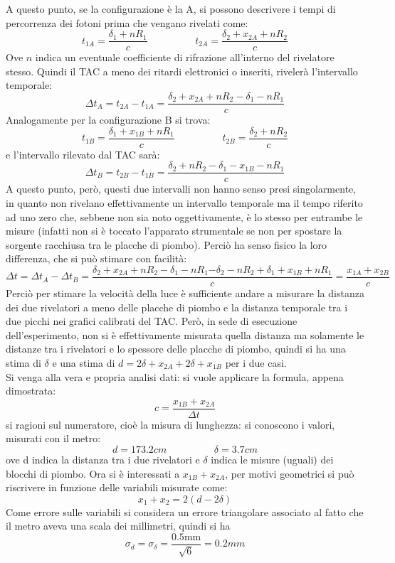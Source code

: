 A questo punto, se la configurazione è la A, si possono descrivere i tempi di percorrenza dei fotoni prima che vengano rivelati come:
$$
  t_{1A} = \frac{\delta_1 + nR_1}{c} \hspace{2cm} t_{2A} = \frac{\delta_2 + x_{2A} + nR_2}{c}
$$
Ove $n$ indica un eventuale coefficiente di rifrazione all'interno del rivelatore stesso. Quindi il TAC a meno dei ritardi elettronici o inseriti, rivelerà l'intervallo temporale:
$$
  \Delta t_A = t_{2A} - t_{1A} = \frac{\delta_2 + x_{2A} + nR_2-\delta_1-nR_1}{c}
$$
Analogamente per la configurazione B si trova:
$$
  t_{1B} = \frac{\delta_1 + x_{1B} + nR_1}{c} \hspace{2cm} t_{2B} = \frac{\delta_2 + nR_2}{c}
$$
e l'intervallo rilevato dal TAC sarà:
$$
  \Delta t_B = t_{2B} - t_{1B} = \frac{\delta_2 + nR_2 - \delta_1 - x_{1B} - nR_1}{c}
$$
A questo punto, però, questi due intervalli non hanno senso presi singolarmente, in quanto non rivelano effettivamente un intervallo temporale ma il tempo riferito ad
uno zero che, sebbene non sia noto oggettivamente, è lo stesso per entrambe le misure (infatti non si è toccato l'apparato strumentale se non per spostare la sorgente
racchiusa tra le placche di piombo). Perciò ha senso fisico la loro differenza, che si può stimare con facilità:
$$
  \Delta t = \Delta t_A - \Delta t_B = \frac{{\delta_2 + x_{2A} + nR_2 - \delta_1 - nR_1}{-\delta_2 - nR_2 + \delta_1 + x_{1B} + nR_1}}{c} = \frac{x_{1A} + x_{2B}}{c}
$$
Perciò per stimare la velocità della luce è sufficiente andare a misurare la distanza dei due rivelatori a meno delle placche di piombo e la distanza temporale tra i due
picchi nei grafici calibrati del TAC. Però, in sede di esecuzione dell'esperimento, non si è effettivamente misurata quella distanza ma solamente le distanze tra i rivelatori e lo spessore delle placche di piombo, quindi si ha una stima di $\delta$ e una stima di $d = 2 \delta + x_{2A} + 2 \delta + x_{1B} $ per i due casi.\\

Si venga alla vera e propria analisi dati: si vuole applicare la formula, appena dimostrata:
$$
  c = \frac{x_{1B}+x_{2A}}{\Delta t}
$$
si ragioni sul numeratore, cioè la misura di lunghezza: si conoscono i valori, misurati con il metro:
$$
  d = 173.2 cm \hspace{2cm} \delta = 3.7 cm
$$
ove d indica la distanza tra i due rivelatori e $\delta$ indica le misure (uguali) dei blocchi di piombo.
Ora si è interessati a $x_{1B}+x_{2A}$, per motivi geometrici si può riscrivere in funzione delle variabili misurate come:
$$
  x_1+x_2 = 2 ( d - 2 \delta)
$$
Come errore sulle variabili si considera un errore triangolare associato al fatto che il metro aveva una scala dei millimetri, quindi si ha
$$
  \sigma_d = \sigma_\delta = \frac{0.5\text{mm}}{\sqrt6} = 0.2 mm
$$
\\

